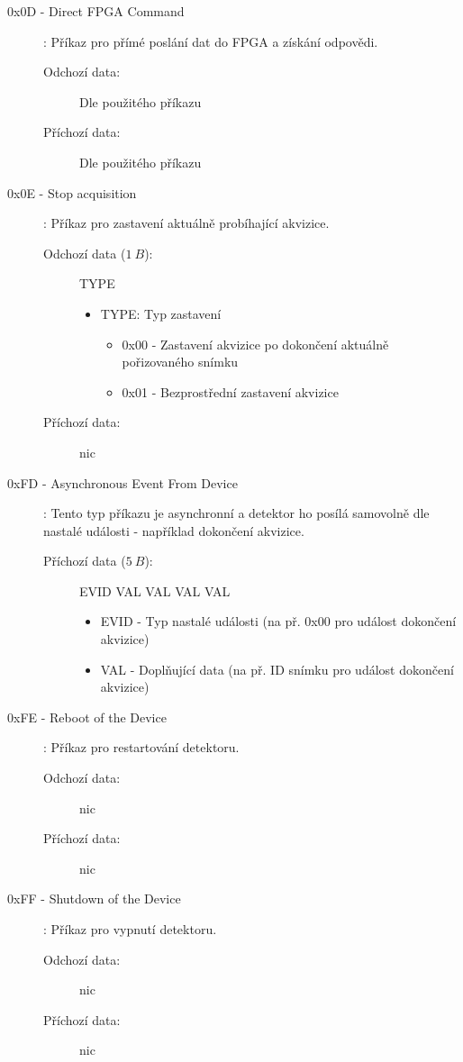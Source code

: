 \begin{description}
\begin{description}
\begin{itemize}
				\end{itemize}
		\end{description}
	\item[0x0D - Direct FPGA Command]:
		Příkaz pro přímé poslání dat do FPGA a získání odpovědi.
		\begin{description}
			\item[Odchozí data:] Dle použitého příkazu
			\item[Příchozí data:] Dle použitého příkazu
		\end{description}
	\item[0x0E - Stop acquisition]:
		Příkaz pro zastavení aktuálně probíhající akvizice.
		\begin{description}
			\item[Odchozí data ($1~B$):] TYPE
				\begin{itemize}
					\item TYPE: Typ zastavení
						\begin{itemize}
							\item 0x00 - Zastavení akvizice po dokončení aktuálně pořizovaného snímku
							\item 0x01 - Bezprostřední zastavení akvizice 
						\end{itemize}
				\end{itemize}
			\item[Příchozí data:] nic
		\end{description}
	\item[0xFD - Asynchronous Event From Device]:
		Tento typ příkazu je asynchronní a detektor ho posílá samovolně dle nastalé události - například dokončení akvizice.
		\begin{description}
			\item[Příchozí data ($5~B$):] EVID VAL VAL VAL VAL
				\begin{itemize}
					\item EVID - Typ nastalé události (na př. 0x00 pro událost dokončení akvizice)
					\item VAL - Doplňující data (na př. ID snímku pro událost dokončení akvizice)
				\end{itemize}
		\end{description}
	\item[0xFE - Reboot of the Device]:
		Příkaz pro restartování detektoru.
		\begin{description}
			\item[Odchozí data:] nic
			\item[Příchozí data:] nic
		\end{description}
	\item[0xFF - Shutdown of the Device]:
		Příkaz pro vypnutí detektoru.
		\begin{description}
			\item[Odchozí data:] nic
			\item[Příchozí data:] nic
		\end{description}
\end{description}


